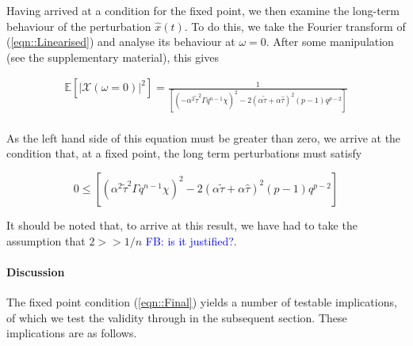 \documentclass[sigconf,anonymous]{aamas}
\newcommand{\ttau}{\tilde{\tau}}
\newcommand{\htau}{\hat{\tau}}
\newcommand{\xpert}{\hat{x}(t)}
\newcommand\fb[1]{\textcolor{blue}{FB: #1}}
\begin{document}
Having arrived at a condition for the fixed point, we then examine the
long-term behaviour of the perturbation $\xpert$. To do this, we take
the Fourier transform of (\ref{eqn::Linearised}) and analyse its
behaviour at $\omega = 0$. After some manipulation (see the supplementary material), this gives

\begin{equation}
\begin{split}
        \mathbb{E}[|\mathcal{X}(\omega = 0)|^2] = \frac{1}{\left[ (-\alpha^2 \ttau^2 \Gamma q^{n-1} \chi)^2 - 2 (\alpha \ttau + \alpha \htau)^2 (p-1)q^{p-2}\right]} \\
\end{split}
\end{equation}

As the left hand side of this equation must be greater than zero, we arrive at the condition that, at a fixed point, the long term perturbations must satisfy

\begin{equation}
    \label{eqn::Final}
    0 \leq \left [(\alpha^2 \ttau^2 \Gamma q^{n-1} \chi)^{2} - 2 (\alpha \ttau + \alpha \htau)^2 (p-1)q^{p-2} \right ]
\end{equation}

It should be noted that, to arrive at this result, we have had to take the assumption that $2 >> 1/n$ \fb{is it justified?}. 


\paragraph{Discussion}
The fixed point condition (\ref{eqn::Final}) yields a number of testable implications, of which we test the validity through in the subsequent section. These implications are as follows.
\end{document}
